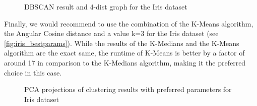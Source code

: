 \begin{figure}[H]
	\caption{DBSCAN result and 4-dist graph for the Iris dataset} 
	\label{dbscaniris}
\end{figure}

Finally, we would recommend to use the combination of the K-Means algorithm, the Angular Cosine distance and a value k=3 for the Iris dataset (see \autoref{fig:iris_bestparams}). While the results of the K-Medians and the K-Means algorithm are the exact same, the runtime of K-Means is better by a factor of around 17 in comparison to the K-Medians algorithm, making it the preferred choice in this case. \\

\begin{figure}[H]
	\centering
	\caption{PCA projections of clustering results with preferred parameters for Iris dataset}
	\label{fig:iris_bestparams}
\end{figure}

